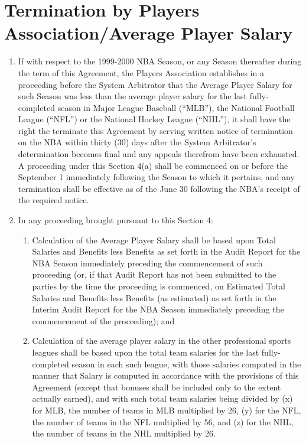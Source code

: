 \documentclass[
]{book}
\providecommand{\tightlist}{%
  \setlength{\itemsep}{0pt}\setlength{\parskip}{0pt}}
\begin{document}
\hypertarget{termination-by-players-associationaverage-player-salary}{%
\section{Termination by Players Association/Average Player Salary}\label{termination-by-players-associationaverage-player-salary}}

\begin{enumerate}
\def\labelenumi{(\alph{enumi})}
\tightlist
\item
  If with respect to the 1999-2000 NBA Season, or any Season thereafter during the term of this Agreement, the Players Association establishes in a proceeding before the System Arbitrator that the Average Player Salary for such Season was less than the average player salary for the last fully-completed season in Major League Baseball (``MLB''), the National Football League (``NFL'') or the National Hockey League (``NHL''), it shall have the right the terminate this Agreement by serving written notice of termination on the NBA within thirty (30) days after the System Arbitrator's determination becomes final and any appeals therefrom have been exhausted. A proceeding under this Section 4(a) shall be commenced on or before the September 1 immediately following the Season to which it pertains, and any termination shall be effective as of the June 30 following the NBA's receipt of the required notice.
\item
  In any proceeding brought pursuant to this Section 4:

  \begin{enumerate}
  \def\labelenumii{(\roman{enumii})}
  \tightlist
  \item
    Calculation of the Average Player Salary shall be based upon Total Salaries and Benefits less Benefits as set forth in the Audit Report for the NBA Season immediately preceding the commencement of such proceeding (or, if that Audit Report has not been submitted to the parties by the time the proceeding is commenced, on Estimated Total Salaries and Benefits less Benefits (as estimated) as set forth in the Interim Audit Report for the NBA Season immediately preceding the commencement of the proceeding); and
  \item
    Calculation of the average player salary in the other professional sports leagues shall be based upon the total team salaries for the last fully-completed season in each such league, with those salaries computed in the manner that Salary is computed in accordance with the provisions of this Agreement (except that bonuses shall be included only to the extent actually earned), and with such total team salaries being divided by (x) for MLB, the number of teams in MLB multiplied by 26, (y) for the NFL, the number of teams in the NFL multiplied by 56, and (z) for the NHL, the number of teams in the NHL multiplied by 26.
  \end{enumerate}
\end{enumerate}
\end{document}
